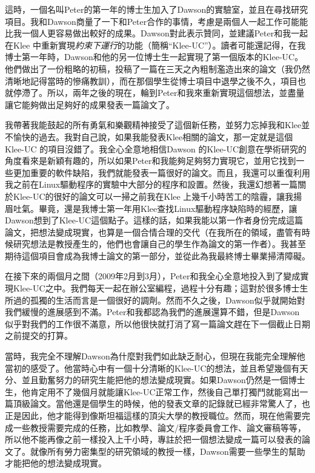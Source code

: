 \documentclass[12pt,UTF8,nofonts]{book}
\begin{document}
這時，一個名叫Peter的第一年的博士生加入了Dawson的實驗室，並且在尋找研究項目。我和Dawson商量了一下和Peter合作的事情，考慮是兩個人一起工作可能能比我一個人更容易做出較好的成果。Dawson對此表示贊同，並建議Peter和我一起在Klee 中重新實現\emph{約束下運行}的功能（簡稱“Klee-UC”）。讀者可能還記得，在我博士第一年時，Dawson和他的另一位博士生一起實現了第一個版本的Klee-UC。他們做出了一份粗略的初稿，投稿了一篇在三天之內粗制濫造出來的論文（我仍然清晰地記得當時的慘痛教訓），而在那個學生從博士項目中退學之後不久，項目也就停滯了。所以，兩年之後的現在，輪到Peter和我來重新實現這個想法，並盡量讓它能夠做出足夠好的成果發表一篇論文了。

我帶著我能鼓起的所有勇氣和樂觀精神接受了這個新任務，並努力忘掉我和Klee並不愉快的過去。我對自己說，如果我能發表Klee相關的論文，那一定就是這個Klee-UC 的項目沒錯了。我全心全意地相信Dawson 的Klee-UC創意在學術研究的角度看來是新穎有趣的，所以如果Peter和我能夠足夠努力實現它，並用它找到一些更加重要的軟件缺陷，我們就能發表一篇很好的論文。而且，我還可以重復利用我之前在Linux驅動程序的實驗中大部分的程序和設置。然後，我還幻想著一篇關於Klee-UC的很好的論文可以一掃之前我在Klee 上幾千小時苦工的陰霾，讓我揚眉吐氣。畢竟，還是我博士第一年用Klee查找Linux驅動程序缺陷時的經歷，讓Dawson想到了Klee-UC這個點子。這樣的話，如果我能以第一作者身份完成這篇論文，把想法變成現實，也算是一個合情合理的交代（在我所在的領域，盡管有時候研究想法是教授產生的，他們也會讓自己的學生作為論文的第一作者）。我甚至期待這個項目會成為我博士論文的第一部分，並從此為我最終博士畢業掃清障礙。

在接下來的兩個月之間（2009年2月到3月），Peter和我全心全意地投入到了變成實現Klee-UC之中。我們每天一起在辦公室編程，過程十分有趣；這對於很多博士生所過的孤獨的生活而言是一個很好的調劑。然而不久之後，Dawson似乎就開始對我們緩慢的進展感到不滿。Peter和我都認為我們的進展還算不錯，但是Dawson 似乎對我們的工作很不滿意，所以他很快就打消了寫一篇論文趕在下一個截止日期之前提交的打算。

當時，我完全不理解Dawson為什麼對我們如此缺乏耐心，但現在我能完全理解他當初的感受了。他當時心中有一個十分清晰的Klee-UC的想法，並且希望幾個有天分、並且勤奮努力的研究生能把他的想法變成現實。如果Dawson仍然是一個博士生，他肯定用不了幾個月就能讓Klee-UC正常工作，然後自己單打獨鬥就能寫出一篇頂級論文。當他還是個學生的時候，他的發表文章的記錄就已經非常驚人了，也正是因此，他才能得到像斯坦福這樣的頂尖大學的教授職位。然而，現在他需要完成一些教授需要完成的任務，比如教學、論文/程序委員會工作、論文審稿等等，所以他不能再像之前一樣投入上千小時，專註於把一個想法變成一篇可以發表的論文了。就像所有勞力密集型的研究領域的教授一樣，Dawson需要一些學生的幫助才能把他的想法變成現實。
\end{document}
